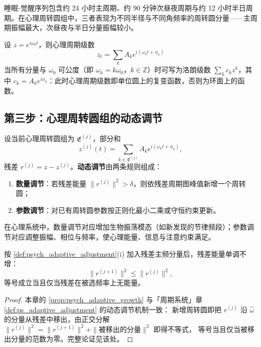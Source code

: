 \begin{example}[睡眠-觉醒的周期级数]\label{ex:psych_sleep_series}
睡眠-觉醒序列包含约 24 小时主周期、约 90 分钟次昼夜周期与约 12 小时半日周期。在心理周转圆组中，三者表现为不同半径与不同角频率的周转圆分量——主周期振幅最大，次昼夜与半日分量振幅较小。
\end{example}

\begin{remark}[周期级数即复变函数]\label{rem:psych_series_complex}
设 $z=e^{i\omega_0t}$，则心理周期级数
\[
z_t=\sum_k A_k e^{i(\omega_k t+\phi_k)}
\]
当所有分量与 $\omega_0$ 可公度（即 $\omega_k=k\omega_0$，$k\in\mathbb Z$）时可写为洛朗级数 $\sum_k c_k z^k$，其中 $c_k=A_k e^{i\phi_k}$：此时心理周期级数即单位圆上的复变函数，否则为环面上的函数。
\end{remark}

\subsection{第三步：心理周转圆组的动态调节}

\begin{definition}[心理周转圆组的动态调节]\label{def:psych_adaptive_adjustment}
设当前心理周转圆组为 $\mathfrak E^{(j)}$，部分和
\[
z^{(j)}(t)=\sum_{k\in\mathfrak E^{(j)}}A_k e^{i(\omega_k t+\phi_k)},
\]
残差 $r^{(j)}=z-z^{(j)}$。\textbf{动态调节}由两条规则组成：
\begin{enumerate}[label=(\roman*)]
    \item \textbf{数量调节}：若残差能量 $\|r^{(j)}\|^2>\delta$，则依残差周期图峰值新增一个周转圆；
    \item \textbf{参数调节}：对已有周转圆参数按正则化最小二乘或守恒约束更新。
\end{enumerate}
在心理系统中，数量调节对应增加生物振荡模态（如新发现的节律频段）；参数调节对应调整振幅、相位与频率，使心理能量、信息与注意约束满足。
\end{definition}

\begin{proposition}[数量调节的单调性]\label{prop:psych_adaptive_growth}
按 \cref{def:psych_adaptive_adjustment}(i) 加入残差主频分量后，残差能量单调不增：
\[
\|r^{(j+1)}\|^2\le\|r^{(j)}\|^2,
\]
等号成立当且仅当残差在被选频率上无能量。
\end{proposition}

\begin{proof}
本章的 \cref{prop:psych_adaptive_growth} 与「周期系统」章 \cref{def:ps_adaptive_adjustment} 的动态调节机制一致：
新增周转圆即把 $r^{(j)}$ 沿 $\hat\omega$ 的分量从残差中移出，由正交分解
$\|r^{(j)}\|^2=\|r^{(j+1)}\|^2+\|\text{被移出的分量}\|^2$ 即得不等式，
等号当且仅当被移出分量的范数为零。完整论证见该处。
\end{proof}


